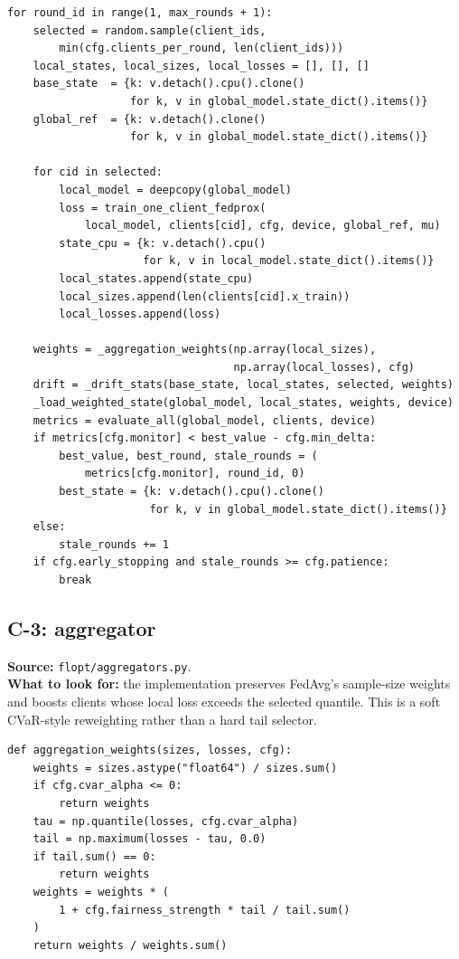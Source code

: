 \begin{lstlisting}
for round_id in range(1, max_rounds + 1):
    selected = random.sample(client_ids,
        min(cfg.clients_per_round, len(client_ids)))
    local_states, local_sizes, local_losses = [], [], []
    base_state  = {k: v.detach().cpu().clone()
                   for k, v in global_model.state_dict().items()}
    global_ref  = {k: v.detach().clone()
                   for k, v in global_model.state_dict().items()}

    for cid in selected:
        local_model = deepcopy(global_model)
        loss = train_one_client_fedprox(
            local_model, clients[cid], cfg, device, global_ref, mu)
        state_cpu = {k: v.detach().cpu()
                     for k, v in local_model.state_dict().items()}
        local_states.append(state_cpu)
        local_sizes.append(len(clients[cid].x_train))
        local_losses.append(loss)

    weights = _aggregation_weights(np.array(local_sizes),
                                   np.array(local_losses), cfg)
    drift = _drift_stats(base_state, local_states, selected, weights)
    _load_weighted_state(global_model, local_states, weights, device)
    metrics = evaluate_all(global_model, clients, device)
    if metrics[cfg.monitor] < best_value - cfg.min_delta:
        best_value, best_round, stale_rounds = (
            metrics[cfg.monitor], round_id, 0)
        best_state = {k: v.detach().cpu().clone()
                      for k, v in global_model.state_dict().items()}
    else:
        stale_rounds += 1
    if cfg.early_stopping and stale_rounds >= cfg.patience:
        break
\end{lstlisting}

\subsection{C-3: \cvar{} aggregator}
\textbf{Source:} \texttt{flopt/aggregators.py}.\\
\textbf{What to look for:} the implementation preserves FedAvg's
sample-size weights and boosts clients whose local loss exceeds the
selected quantile. This is a soft CVaR-style reweighting rather than a
hard tail selector.

\begin{lstlisting}
def aggregation_weights(sizes, losses, cfg):
    weights = sizes.astype("float64") / sizes.sum()
    if cfg.cvar_alpha <= 0:
        return weights
    tau = np.quantile(losses, cfg.cvar_alpha)
    tail = np.maximum(losses - tau, 0.0)
    if tail.sum() == 0:
        return weights
    weights = weights * (
        1 + cfg.fairness_strength * tail / tail.sum()
    )
    return weights / weights.sum()
\end{lstlisting}

